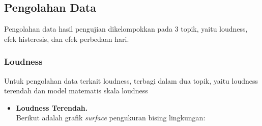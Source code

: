 \documentclass[12pt,]{article}
\begin{document}
	\subsection{Pengolahan Data}

	Pengolahan data hasil pengujian dikelompokkan pada 3 topik, yaitu loudness, efek histeresis, dan efek perbedaan hari.

	\subsubsection{Loudness}

	Untuk pengolahan data terkait loudness, terbagi dalam dua topik, yaitu loudness terendah dan model matematis skala loudness

	\begin{itemize}
		\item \textbf{Loudness Terendah.}\\

		Berikut adalah grafik \textit{surface} pengukuran bising lingkungan:


\end{itemize}
\end{document}
